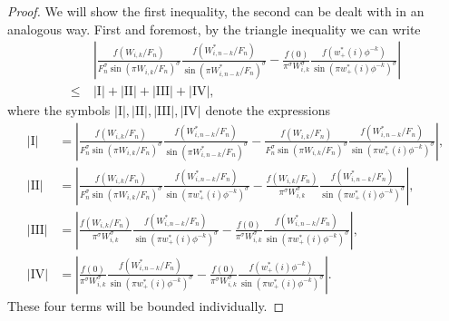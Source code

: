 \documentclass[]{interact}
\theoremstyle{definition}
\numberwithin{table}{section} %
\numberwithin{figure}{section}
\begin{document}
\begin{proof}
    We will show the first inequality, the second can be dealt with in an analogous way. First and foremost, by the triangle inequality we can write
    \begin{align*}
        & \left|\frac{f(W_{i, k}/F_n)}{F_n^\sigma {\sin(\pi W_{i, k}/F_n)}^\sigma} \frac{f(W^*_{i, n-k}/F_n)}{{\sin(\pi W^*_{i, n-k}/F_n)}^\sigma} - \frac{f(0) }{\pi^\sigma W_{i, k}^\sigma} \frac{f(w_+^*(i) \phi^{-k})}{{\sin(\pi w_+^*(i) \phi^{-k})}^\sigma}\right| \\
        \leq ~ & |\text{I}| + |\text{II}| + |\text{III}| + |\text{IV}|,
    \end{align*}
    where the symbols $|\text{I}|, |\text{II}|, |\text{III}|, |\text{IV}|$ denote the expressions
    \begin{align*}
        |\text{I}| & = \left| \frac{f(W_{i, k}/F_n)}{F_n^\sigma{\sin(\pi W_{i, k}/F_n)}^\sigma} \frac{f(W^*_{i, n-k}/F_n)}{{\sin(\pi W^*_{i, n-k}/F_n)}^\sigma} - \frac{f(W_{i, k}/F_n)}{F_n^\sigma{\sin(\pi W_{i, k}/F_n)}^\sigma} \frac{f(W^*_{i, n-k}/F_n)}{\sin(\pi w_+^*(i) \phi^{-k})^\sigma} \right|, \\
        |\text{II}| & = \left| \frac{f(W_{i, k}/F_n)}{F_n^\sigma{\sin(\pi W_{i, k}/F_n)}^\sigma} \frac{f(W^*_{i, n-k}/F_n)}{\sin(\pi w_+^*(i) \phi^{-k})^\sigma} - \frac{f(W_{i, k}/F_n)}{\pi^\sigma W_{i, k}^\sigma} \frac{f(W^*_{i, n-k}/F_n)}{\sin(\pi w_+^*(i) \phi^{-k})^\sigma} \right|, \\
        |\text{III}| & = \left| \frac{f(W_{i, k}/F_n)}{\pi^\sigma W_{i, k}^\sigma} \frac{f(W^*_{i, n-k}/F_n)}{\sin(\pi w_+^*(i) \phi^{-k})^\sigma} - \frac{f(0)}{\pi^\sigma W_{i, k}^\sigma} \frac{f(W^*_{i, n-k}/F_n)}{\sin(\pi w_+^*(i) \phi^{-k})^\sigma} \right|, \\
        |\text{IV}| & = \left| \frac{f(0)}{\pi^\sigma W_{i, k}^\sigma} \frac{f(W^*_{i, n-k}/F_n)}{\sin(\pi w_+^*(i) \phi^{-k})^\sigma} - \frac{f(0)}{\pi^\sigma W_{i, k}^\sigma} \frac{f(w_+^*(i) \phi^{-k})}{\sin(\pi w_+^*(i) \phi^{-k})^\sigma} \right|.
    \end{align*}
    These four terms will be bounded individually.
    

\end{proof}
\end{document}
